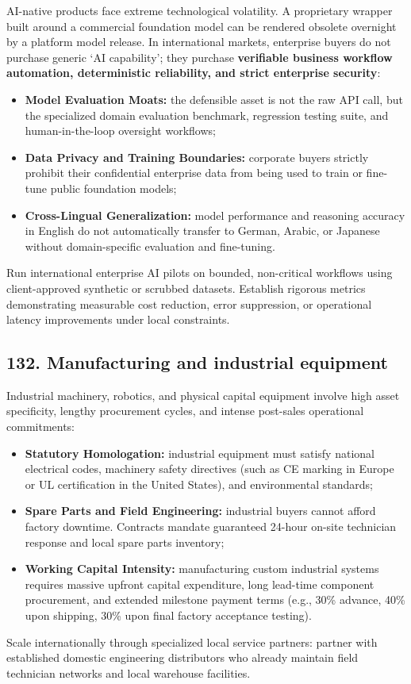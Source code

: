 AI-native products face extreme technological volatility. A proprietary wrapper built around a commercial foundation model can be rendered obsolete overnight by a platform model release. In international markets, enterprise buyers do not purchase generic `AI capability'; they purchase \textbf{verifiable business workflow automation, deterministic reliability, and strict enterprise security}:
\begin{itemize}
    \item \textbf{Model Evaluation Moats:} the defensible asset is not the raw API call, but the specialized domain evaluation benchmark, regression testing suite, and human-in-the-loop oversight workflows;
    \item \textbf{Data Privacy and Training Boundaries:} corporate buyers strictly prohibit their confidential enterprise data from being used to train or fine-tune public foundation models;
    \item \textbf{Cross-Lingual Generalization:} model performance and reasoning accuracy in English do not automatically transfer to German, Arabic, or Japanese without domain-specific evaluation and fine-tuning.
\end{itemize}
Run international enterprise AI pilots on bounded, non-critical workflows using client-approved synthetic or scrubbed datasets. Establish rigorous metrics demonstrating measurable cost reduction, error suppression, or operational latency improvements under local constraints.

\subsection{132. Manufacturing and industrial equipment}

Industrial machinery, robotics, and physical capital equipment involve high asset specificity, lengthy procurement cycles, and intense post-sales operational commitments:
\begin{itemize}
    \item \textbf{Statutory Homologation:} industrial equipment must satisfy national electrical codes, machinery safety directives (such as CE marking in Europe or UL certification in the United States), and environmental standards;
    \item \textbf{Spare Parts and Field Engineering:} industrial buyers cannot afford factory downtime. Contracts mandate guaranteed 24-hour on-site technician response and local spare parts inventory;
    \item \textbf{Working Capital Intensity:} manufacturing custom industrial systems requires massive upfront capital expenditure, long lead-time component procurement, and extended milestone payment terms (e.g., 30\% advance, 40\% upon shipping, 30\% upon final factory acceptance testing).
\end{itemize}
Scale internationally through specialized local service partners: partner with established domestic engineering distributors who already maintain field technician networks and local warehouse facilities.


